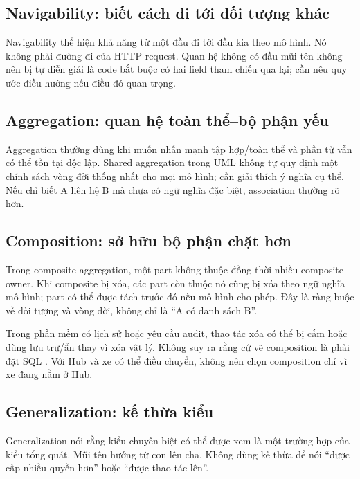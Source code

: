 \subsection{Navigability: biết cách đi tới đối tượng khác}
Navigability thể hiện khả năng từ một đầu đi tới đầu kia theo mô hình. Nó không phải đường đi của HTTP request. Quan hệ không có đầu mũi tên không nên bị tự diễn giải là code bắt buộc có hai field tham chiếu qua lại; cần nêu quy ước điều hướng nếu điều đó quan trọng.

\subsection{Aggregation: quan hệ toàn thể--bộ phận yếu}
Aggregation thường dùng khi muốn nhấn mạnh tập hợp/toàn thể và phần tử vẫn có thể tồn tại độc lập. Shared aggregation trong UML không tự quy định một chính sách vòng đời thống nhất cho mọi mô hình; cần giải thích ý nghĩa cụ thể. Nếu chỉ biết A liên hệ B mà chưa có ngữ nghĩa đặc biệt, association thường rõ hơn.

\subsection{Composition: sở hữu bộ phận chặt hơn}
Trong composite aggregation, một part không thuộc đồng thời nhiều composite owner. Khi composite bị xóa, các part còn thuộc nó cũng bị xóa theo ngữ nghĩa mô hình; part có thể được tách trước đó nếu mô hình cho phép. Đây là ràng buộc về đối tượng và vòng đời, không chỉ là ``A có danh sách B''.

Trong phần mềm có lịch sử hoặc yêu cầu audit, thao tác xóa có thể bị cấm hoặc dùng lưu trữ/ẩn thay vì xóa vật lý. Không suy ra rằng cứ vẽ composition là phải đặt SQL . Với Hub và xe có thể điều chuyển, không nên chọn composition chỉ vì xe đang nằm ở Hub.

\subsection{Generalization: kế thừa kiểu}
Generalization nói rằng kiểu chuyên biệt có thể được xem là một trường hợp của kiểu tổng quát. Mũi tên hướng từ con lên cha. Không dùng kế thừa để nói ``được cấp nhiều quyền hơn'' hoặc ``được thao tác lên''.

